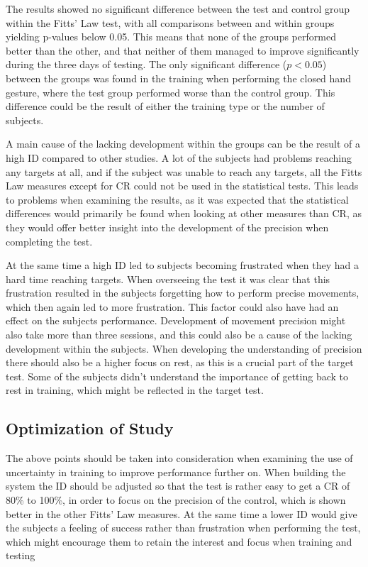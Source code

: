 The results showed no significant difference between the test and control group within the Fitts' Law test, with all comparisons between and within groups yielding p-values below 0.05. This means that none of the groups performed better than the other, and that neither of them managed to improve significantly during the three days of testing. The only significant difference ($p < 0.05$) between the groups was found in the training when performing the closed hand gesture, where the test group performed worse than the control group. This difference could be the result of either the training type or the number of subjects.

A main cause of the lacking development within the groups can be the result of a high ID compared to other studies. A lot of the subjects had problems reaching any targets at all, and if the subject was unable to reach any targets, all the Fitts Law measures except for CR could not be used in the statistical tests. This leads to problems when examining the results, as it was expected that the statistical differences would primarily be found when looking at other measures than CR, as they would offer better insight into the development of the precision when completing the test. 

At the same time a high ID led to subjects becoming frustrated when they had a hard time reaching targets. When overseeing the test it was clear that this frustration resulted in the subjects forgetting how to perform precise movements, which then again led to more frustration. This factor could also have had an effect on the subjects performance. Development of movement precision might also take more than three sessions, and this could also be a cause of the lacking development within the subjects. When developing the understanding of precision there should also be a higher focus on rest, as this is a crucial part of the target test. Some of the subjects didn't understand the importance of getting back to rest in training, which might be reflected in the target test.

\subsection{Optimization of Study}
The above points should be taken into consideration when examining the use of uncertainty in training to improve performance further on. When building the system the ID should be adjusted so that the test is rather easy to get a CR of 80\% to 100\%, in order to focus on the precision of the control, which is shown better in the other Fitts' Law measures. At the same time a lower ID would give the subjects a feeling of success rather than frustration when performing the test, which might encourage them to retain the interest and focus when training and testing

